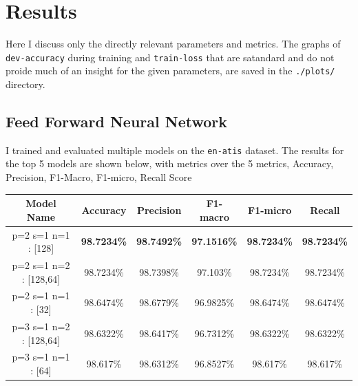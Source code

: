 \section*{Results}

Here I discuss only the directly relevant parameters and metrics. The graphs of \verb|dev-accuracy| during training and \verb|train-loss| that are satandard and do not proide much of an insight for the given parameters, are saved in the \verb|./plots/| directory.

\subsection*{Feed Forward Neural Network}

I trained and evaluated multiple models on the \verb|en-atis| dataset. The results for the top 5 models are shown below, with metrics over the 5 metrics, Accuracy, Precision, F1-Macro, F1-micro, Recall Score 



\begin{table}[h]
    \centering
\begin{tabular}{|c|c|c|c|c|c|}
\hline
Model Name & Accuracy & Precision & F1-macro & F1-micro & Recall \\
\hline 
p=2 s=1 n=1 : [128] & \textbf{98.7234\%} & \textbf{98.7492\%} & \textbf{97.1516\%} & \textbf{98.7234\%} & \textbf{98.7234\%}\\
\hline
p=2 s=1 n=2 : [128,64] & 98.7234\% & 98.7398\% & 97.103\% & 98.7234\% & 98.7234\% \\
\hline 
p=2 s=1 n=1 : [32] & 98.6474\% & 98.6779\% & 96.9825\% & 98.6474\% & 98.6474\% \\
\hline 
p=3 s=1 n=2 : [128,64] & 98.6322\% & 98.6417\% & 96.7312\% & 98.6322\% & 98.6322\% \\ 
\hline 
p=3 s=1 n=1 : [64] & 98.617\% & 98.6312\% & 96.8527\% & 98.617\% & 98.617\% \\
\hline
\end{tabular}
\end{table}

